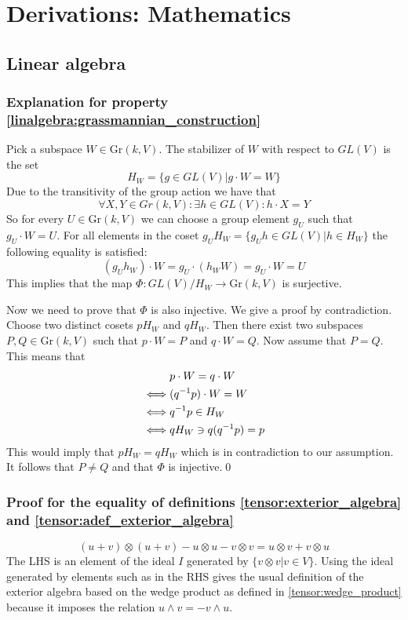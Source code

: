 \chapter{Derivations: Mathematics}

\section{Linear algebra}

\subsection{Explanation for property \ref{linalgebra:grassmannian_construction}}\label{proof:stabilizer}

	Pick a subspace $W\in \text{Gr}(k, V)$. The stabilizer of $W$ with respect to $GL(V)$ is the set \[H_W = \{g\in GL(V)| g\cdot W = W\}\]
	Due to the transitivity of the group action we have that
	\[\forall X, Y\in Gr(k, V): \exists h\in GL(V): h\cdot X = Y\]
	So for every $U\in \text{Gr}(k, V)$ we can choose a group element $g_U$ such that $g_U\cdot W = U$. For all elements in the coset $g_UH_W = \{g_Uh\in GL(V)|h\in H_W\}$ the following equality is satisfied:
	\[(g_Uh_W)\cdot W = g_U\cdot (h_WW) = g_U\cdot W = U\]
	This implies that the map $\Phi:GL(V)/H_W \rightarrow \text{Gr}(k, V)$ is surjective.
	
	Now we need to prove that $\Phi$ is also injective. We give a proof by contradiction. Choose two distinct cosets $pH_W$ and $qH_W$. Then there exist two subspaces $P, Q\in \text{Gr}(k, V)$ such that $p\cdot W = P$ and $q\cdot W = Q$. Now assume that $P = Q$. This means that
	\begin{align*}
		&p\cdot W = q\cdot W\\
		\iff&(q^{-1}p)\cdot W = W\\
		\iff&q^{-1}p\in H_W\\
		\iff&qH_W\mathrel{\reflectbox{$\in$}}q(q^{-1}p) = p
	\end{align*}
	This would imply that $pH_W = qH_W$ which is in contradiction to our assumption. It follows that $P\neq Q$ and that $\Phi$ is injective.\qed

\subsection{Proof for the equality of definitions \ref{tensor:exterior_algebra} and \ref{tensor:adef_exterior_algebra}}
	\begin{equation}
		(u+v)\otimes(u+v) - u\otimes u - v\otimes v = u\otimes v + v\otimes u
	\end{equation}
	The LHS is an element of the ideal $I$ generated by $\{v\otimes v|v\in V\}$. Using the ideal generated by elements such as in the RHS gives the usual definition of the exterior algebra based on the wedge product as defined in \ref{tensor:wedge_product} because it imposes the relation $u\wedge v = -v\wedge u$.
	
